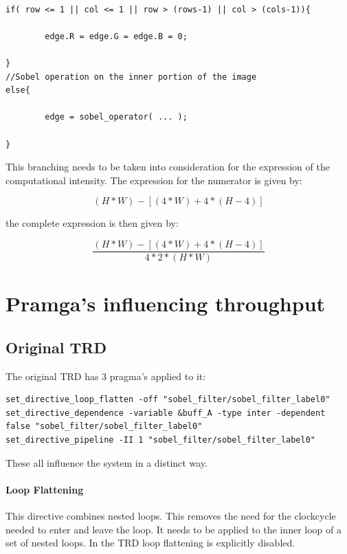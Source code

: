 \documentclass[a4paper]{report}
\begin{document}
\begin{lstlisting}

if( row <= 1 || col <= 1 || row > (rows-1) || col > (cols-1)){
		
		edge.R = edge.G = edge.B = 0;
		
}
//Sobel operation on the inner portion of the image
else{

		edge = sobel_operator( ... );
		
}		
\end{lstlisting}

This branching needs to be taken into consideration for the expression of the computational intensity. The expression for the numerator is given by:

\[
( H * W ) -[ ( 4 * W ) + 4 * ( H - 4 )]
\]


the complete expression is then given by:

\[
\frac{( H * W ) -[ ( 4 * W ) + 4 * ( H - 4 )]}{4 * 2 * ( H * W )}
\]








\section{Pramga's influencing throughput}

\subsection{Original TRD}

The original TRD has 3 pragma's applied to it:

\begin{scriptsize}
\begin{verbatim}
set_directive_loop_flatten -off "sobel_filter/sobel_filter_label0"
set_directive_dependence -variable &buff_A -type inter -dependent false "sobel_filter/sobel_filter_label0"
set_directive_pipeline -II 1 "sobel_filter/sobel_filter_label0"
\end{verbatim}
\end{scriptsize}

These all influence the system in a distinct way.

\paragraph{Loop Flattening} This directive combines nested loops. This removes the need for the clockcycle needed to enter and leave the loop. It needs to be applied to the inner loop of a set of nested loops. In the TRD loop flattening is explicitly disabled.
\end{document}
